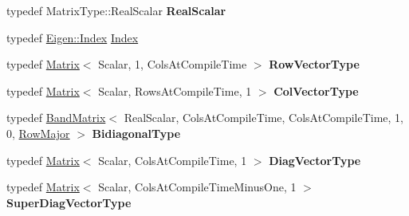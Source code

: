 \begin{DoxyCompactItemize}
typedef Matrix\+Type\+::\+Real\+Scalar {\bfseries Real\+Scalar}
\item 
typedef \hyperlink{namespace_eigen_a62e77e0933482dafde8fe197d9a2cfde}{Eigen\+::\+Index} \hyperlink{class_eigen_1_1internal_1_1_upper_bidiagonalization_adcb14f3919a3dcc9977ba6b8105087fe}{Index}
\item 
\mbox{\label{class_eigen_1_1internal_1_1_upper_bidiagonalization_a43c537195ce8336a04e30246baf6860e}} 
typedef \hyperlink{group___core___module_class_eigen_1_1_matrix}{Matrix}$<$ Scalar, 1, Cols\+At\+Compile\+Time $>$ {\bfseries Row\+Vector\+Type}
\item 
\mbox{\label{class_eigen_1_1internal_1_1_upper_bidiagonalization_aa23c833f35d51d1175d3532fb27396bf}} 
typedef \hyperlink{group___core___module_class_eigen_1_1_matrix}{Matrix}$<$ Scalar, Rows\+At\+Compile\+Time, 1 $>$ {\bfseries Col\+Vector\+Type}
\item 
\mbox{\label{class_eigen_1_1internal_1_1_upper_bidiagonalization_a3ea5d3b9879d66c9a561a8979ad999f3}} 
typedef \hyperlink{group___core___module_class_eigen_1_1internal_1_1_band_matrix}{Band\+Matrix}$<$ Real\+Scalar, Cols\+At\+Compile\+Time, Cols\+At\+Compile\+Time, 1, 0, \hyperlink{group__enums_ggaacded1a18ae58b0f554751f6cdf9eb13acfcde9cd8677c5f7caf6bd603666aae3}{Row\+Major} $>$ {\bfseries Bidiagonal\+Type}
\item 
\mbox{\label{class_eigen_1_1internal_1_1_upper_bidiagonalization_adcf1dbaabda1d16ef09931c5bc2a71db}} 
typedef \hyperlink{group___core___module_class_eigen_1_1_matrix}{Matrix}$<$ Scalar, Cols\+At\+Compile\+Time, 1 $>$ {\bfseries Diag\+Vector\+Type}
\item 
\mbox{\label{class_eigen_1_1internal_1_1_upper_bidiagonalization_ad7491c3ca1a7985168c2c2b1dafe4ddf}} 
typedef \hyperlink{group___core___module_class_eigen_1_1_matrix}{Matrix}$<$ Scalar, Cols\+At\+Compile\+Time\+Minus\+One, 1 $>$ {\bfseries Super\+Diag\+Vector\+Type}
\item 
\mbox{\label{class_eigen_1_1internal_1_1_upper_bidiagonalization_a159f80e8c094ea6b53082ac9446923a8}} 

\end{DoxyCompactItemize}
